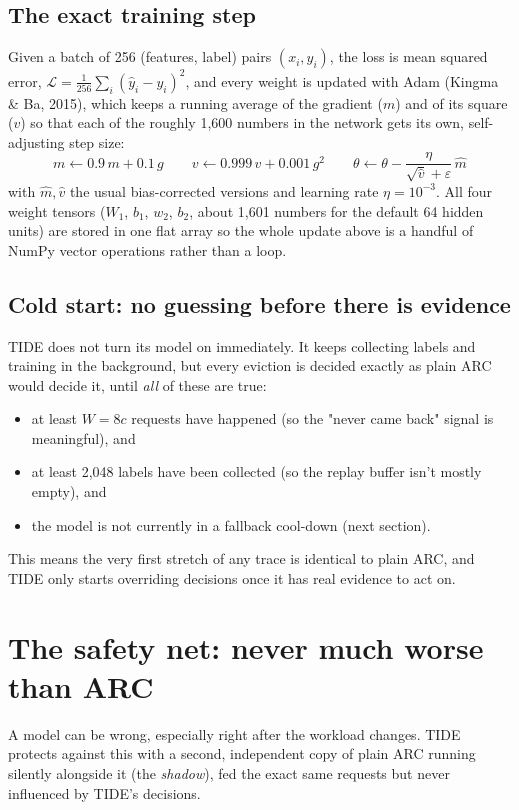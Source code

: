 \documentclass[10pt,a4paper]{article}
\begin{document}
\subsection{The exact training step}
Given a batch of 256 (features, label) pairs $(x_i, y_i)$, the loss is mean squared error,
$\mathcal{L} = \frac{1}{256}\sum_i (\hat{y}_i - y_i)^2$, and every weight is updated with Adam
(Kingma \& Ba, 2015), which keeps a running average of the gradient ($m$) and of its square ($v$) so that
each of the roughly 1{,}600 numbers in the network gets its own, self-adjusting step size:
\[
m \leftarrow 0.9\,m + 0.1\,g \qquad v \leftarrow 0.999\,v + 0.001\,g^2 \qquad
\theta \leftarrow \theta - \frac{\eta}{\sqrt{\hat v} + \varepsilon}\,\hat m
\]
with $\hat m, \hat v$ the usual bias-corrected versions and learning rate $\eta = 10^{-3}$. All four weight
tensors ($W_1$, $b_1$, $w_2$, $b_2$, about 1{,}601 numbers for the default 64 hidden units) are stored in
one flat array so the whole update above is a handful of NumPy vector operations rather than a loop.

\subsection{Cold start: no guessing before there is evidence}\label{sec:coldstart}
TIDE does not turn its model on immediately. It keeps collecting labels and training in the background,
but every eviction is decided exactly as plain ARC would decide it, until \emph{all} of these are true:
\begin{itemize}
  \item at least $W = 8c$ requests have happened (so the "never came back" signal is meaningful), and
  \item at least 2{,}048 labels have been collected (so the replay buffer isn't mostly empty), and
  \item the model is not currently in a fallback cool-down (next section).
\end{itemize}
This means the very first stretch of any trace is identical to plain ARC, and TIDE only starts
overriding decisions once it has real evidence to act on.

\section{The safety net: never much worse than ARC}
A model can be wrong, especially right after the workload changes. TIDE protects against this with a
second, independent copy of plain ARC running silently alongside it (the \emph{shadow}), fed the exact
same requests but never influenced by TIDE's decisions.
\end{document}
